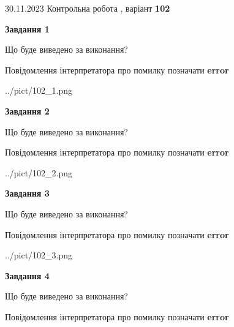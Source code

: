 \documentclass[12pt, ukrainian]{article}
\begin{document}
{{30.11.2023 Контрольна робота , варіант  \No \textbf { 102 }\par}}
{




{\begin {center}\textbf{Завдання 1}\end {center}}\par
Що буде виведено за виконання? \par
Повідомлення інтерпретатора про помилку позначати \textbf{error}

\begin{center}
	{../pict/102_1.png}
\end{center}
\newpage

{\begin {center}\textbf{Завдання 2}\end {center}}\par
Що буде виведено за виконання? \par
Повідомлення інтерпретатора про помилку позначати \textbf{error}

\begin{center}
	{../pict/102_2.png}
\end{center}
\newpage

{\begin {center}\textbf{Завдання 3}\end {center}}\par
Що буде виведено за виконання? \par
Повідомлення інтерпретатора про помилку позначати \textbf{error}

\begin{center}
	{../pict/102_3.png}
\end{center}
\newpage

{\begin {center}\textbf{Завдання 4}\end {center}}\par
Що буде виведено за виконання? \par
Повідомлення інтерпретатора про помилку позначати \textbf{error}

}
\end{document}
